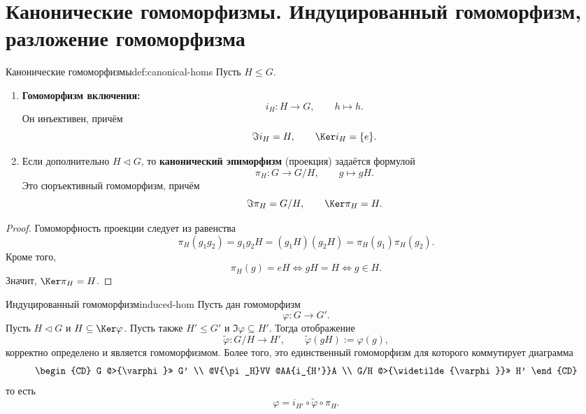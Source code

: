 
\section{Канонические гомоморфизмы. Индуцированный гомоморфизм, разложение гомоморфизма}

\begin{Definition}{Канонические гомоморфизмы}{def:canonical-homs}
	Пусть $H\le G$.
	\begin{enumerate}
		\item \textbf{Гомоморфизм включения:}
		\[
		i_H\colon H\to G, \qquad h\mapsto h.
		\]
		Он инъективен, причём
		\[
		\Im i_H = H, \qquad \Ker i_H = \{e\}.
		\]
		\item Если дополнительно $H\triangleleft G$, то \textbf{канонический эпиморфизм} (проекция) задаётся формулой
		\[
		\pi_H\colon G\to G/H, \qquad g\mapsto gH.
		\]
		Это сюръективный гомоморфизм, причём
		\[
		\Im \pi_H = G/H, \qquad \Ker \pi_H = H.
		\]
	\end{enumerate}
\end{Definition}

\begin{proof}
	Гомоморфность проекции следует из равенства
	\[
	\pi_H(g_1g_2)=g_1g_2H=(g_1H)(g_2H)=\pi_H(g_1)\pi_H(g_2).
	\]
	Кроме того,
	\[
	\pi_H(g)=eH \Longleftrightarrow gH=H \Longleftrightarrow g\in H.
	\]
	Значит, $\Ker \pi_H=H$.
\end{proof}

\begin{Theorem}{Индуцированный гомоморфизм}{induced-hom}
	Пусть дан гомоморфизм
	\[
	\varphi\colon G\to G'.
	\]
	Пусть $H\triangleleft G$ и $H\subseteq \Ker\varphi$. Пусть также $H'\le G'$ и
	$\Im\varphi\subseteq H'$. Тогда отображение
	\[
	\widetilde\varphi\colon G/H\to H', \qquad \widetilde\varphi(gH):=\varphi(g),
	\]
	корректно определено и является гомоморфизмом. Более того, это единственный гомоморфизм для которого коммутирует диаграмма
\[
\begin{CD}
	G @>{\varphi}>> G' \\
	@V{\pi_H}VV @AA{i_{H'}}A \\
	G/H @>{\widetilde{\varphi}}>> H'
\end{CD}
\]
	то есть
	\[
	\varphi = i_{H'}\circ \widetilde\varphi\circ \pi_H.
	\]
\end{Theorem}

